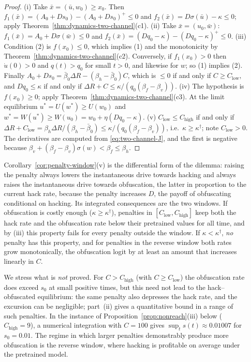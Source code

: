 \begin{proof}
(i) Take $\bar x=(\bar u,w_0)\ge x_0$. Then
$f_1(\bar x)=(A_0+Ds_0)-(A_0+Ds_0)^+\le0$ and
$f_2(\bar x)=D\sigma(\bar u)-\kappa\le0$; apply
Theorem~\ref{thm:dynamics-two-channel}(c1). (ii) Take $\bar x=(u_0,\bar w)$:
$f_1(\bar x)=A_0+D\sigma(\bar w)\le0$ and
$f_2(\bar x)=(Dq_0-\kappa)-(Dq_0-\kappa)^+\le0$. (iii) Condition (2) is
$f(x_0)\le0$, which implies (1) and the monotonicity by
Theorem~\ref{thm:dynamics-two-channel}(c2). Conversely, if $f_1(x_0)>0$
then $\dot u(0)>0$ and $q(t)>q_0$ for small $t>0$, and likewise for $w$; so
(1) implies (2). Finally
$A_0+Ds_0=\bar\beta_0\Delta R-(\beta_h-\bar\beta_0)C$, which is $\le0$ if
and only if $C\ge C_{\mathrm{low}}$, and $Dq_0\le\kappa$ if and only if
$\Delta R+C\le\kappa/(q_0(\beta_f-\beta_v))$. (iv) The hypothesis is
$f(x_0)\ge0$; apply Theorem~\ref{thm:dynamics-two-channel}(c3). At the
limit equilibrium $u^\ast=U(w^\ast)\ge U(w_0)$ and
$w^\ast=W(u^\ast)\ge W(u_0)=w_0+\eta(Dq_0-\kappa)$. (v)
$C_{\mathrm{low}}\le C_{\mathrm{high}}$ if and only if
$\Delta R+C_{\mathrm{low}}=\beta_h\Delta R/(\beta_h-\bar\beta_0)\le\kappa/(q_0(\beta_f-\beta_v))$,
i.e.\ $\kappa\ge\kappa^\dagger$; note $C_{\mathrm{low}}>0$. The derivatives
are computed from \eqref{eq:two-channel-J}, and the first is negative
because $\beta_v+(\beta_f-\beta_v)\sigma(w)<\beta_f\le\beta_h$.
\end{proof}

\begin{remark}
\label{rem:dilemma}
Corollary~\ref{cor:penalty-window}(v) is the differential form of the
dilemma: raising the penalty always lowers the instantaneous drive towards
hacking and always raises the instantaneous drive towards obfuscation, the
latter in proportion to the current hack rate, because the penalty
increases $D$, the payoff of obfuscating conditional on hacking. Its
integrated consequences are the two windows. If obfuscation is costly
enough ($\kappa\ge\kappa^\dagger$), penalties in
$[C_{\mathrm{low}},C_{\mathrm{high}}]$ keep both the hack rate and the
obfuscation rate below their pretrained values for all time, and by
(iii) this property fails for every penalty outside the window. If
$\kappa<\kappa^\dagger$, \emph{no} penalty has this property, and for
penalties in the reverse window both rates grow monotonically, the
obfuscation logit by at least an amount that increases linearly in $C$.

We stress what is \emph{not} proved. For $C>C_{\mathrm{high}}$ (with
$C\ge C_{\mathrm{low}}$) the obfuscation rate does exceed $s_0$ at small
positive times, but this need not lead to the hack--obfuscated equilibrium:
the same penalty also depresses the hack rate, and the excursion can be
negligible; part~(ii) gives a quantitative bound in a range of such
penalties. In the instance of Proposition~\ref{prop:nonreach}(iii) below
($C_{\mathrm{high}}=9$), a numerical integration with $C=100$ gives
$\sup_ts(t)\approx0.01007$ for $s_0=0.01$. The regime in which larger
penalties demonstrably produce more obfuscation is the reverse window,
where hacking is profitable on average under the pretrained model.
\end{remark}

